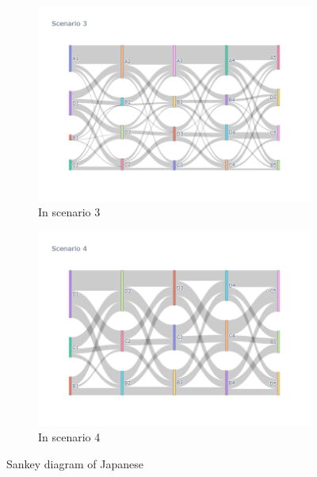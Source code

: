 \begin{figure}[h]
\begin{subfigure}{0.5\textwidth}
    \includegraphics[width=\linewidth]{Figure/Figure27c.jpg}
    \caption{In scenario 3}
    \label{fig27c}
  \end{subfigure}
  \begin{subfigure}{0.5\textwidth}
    \centering
    \includegraphics[width=\linewidth]{Figure/Figure27d.jpg}
    \caption{In scenario 4}
    \label{fig27d}
  \end{subfigure}
  \caption{Sankey diagram of Japanese }
  \label{fig27}
\end{figure}

